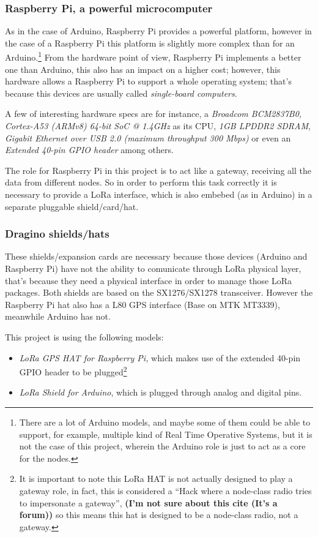 \documentclass[11pt,a4paper,dvipsnames,twoside]{article}
\newcommand{\doubt}[1] {\textbf{\color{Red3}#1}}
\begin{document}
\subsubsection{Raspberry Pi, a powerful microcomputer}
As in the case of Arduino, Raspberry Pi provides a powerful platform, however in the case of a Raspberry Pi this platform is slightly more complex than for an Arduino.\footnote{There are a lot of Arduino models, and maybe some of them could be able to support, for example, multiple kind of Real Time Operative Systems, but it is not the case of this project, wherein the Arduino role is just to act as a core for the nodes.} From the hardware point of view, Raspberry Pi implements a better one than Arduino, this also has an impact on a higher cost; however, this hardware allows a Raspberry Pi to support a whole operating system; that's because this devices are usually called \textit{single-board computers}.

A few of interesting hardware specs are for instance, a \textit{Broadcom BCM2837B0, Cortex-A53 (ARMv8) 64-bit SoC @ 1.4GHz} as its CPU, \textit{1GB LPDDR2 SDRAM}, \textit{Gigabit Ethernet over USB 2.0 (maximum throughput 300 Mbps)} or even an \textit{Extended 40-pin GPIO header} among others.\cite{RPiSpecs}

The role for Raspberry Pi in this project is to act like a gateway, receiving all the data from different nodes. So in order to perform this task correctly it is necessary to provide a LoRa interface, which is also embebed (as in Arduino) in a separate pluggable shield/card/hat.

\subsubsection{Dragino shields/hats}\label{sssec:DraginoShields}
These shields/expansion cards are necessary because those devices (Arduino and Raspberry Pi) have not the ability to comunicate through LoRa physical layer, that's because they need a physical interface in order to manage those LoRa packages. Both shields are based on the SX1276/SX1278 transceiver. However the Raspberry Pi hat also has a L80 GPS interface (Base on MTK MT3339), meanwhile Arduino has not.

This project is using the following models: 

\begin{itemize}
  \item \textit{LoRa GPS HAT for Raspberry Pi,}\cite{DraginoRpiHat} which makes use of the extended 40-pin GPIO header to be plugged\footnote{It is important to note this LoRa HAT is not actually designed to play a gateway role, in fact, this is considered a \enquote{Hack where a node-class radio tries to impersonate a gateway}\cite{RpiHatHack}, \doubt{(I'm not sure about this cite (It's a forum))} so this means this hat is designed to be a node-class radio, not a gateway.}
  \item \textit{LoRa Shield for Arduino}\cite{DraginoArdShield}, which is plugged through analog and digital pins.
\end{itemize}
\end{document}
